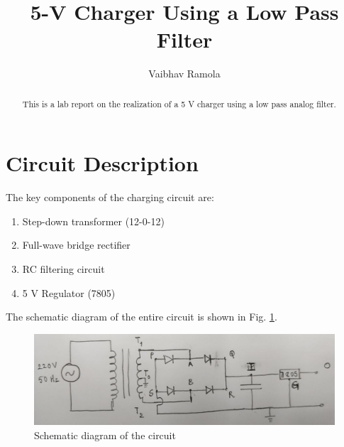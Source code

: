 \documentclass[journal,12pt,twocolumn]{IEEEtran}
\begin{document}
\let\StandardTheFigure\thefigure
\renewcommand{\thefigure}{\arabic{section}.\arabic{figure}}
\makeatletter
{}
\makeatother


\def\putbox#1#2#3{\makebox[0in][l]{\makebox[#1][l]{}\raisebox{\baselineskip}[0in][0in]{\raisebox{#2}[0in][0in]{#3}}}}
\def\rightbox#1{\makebox[0in][r]{#1}}
\def\centbox#1{\makebox[0in]{#1}}
\def\topbox#1{\raisebox{-\baselineskip}[0in][0in]{#1}}
\def\midbox#1{\raisebox{-0.5\baselineskip}[0in][0in]{#1}}

\vspace{3cm}

\title{5-V Charger Using a Low Pass Filter}
\author{Vaibhav Ramola}
\maketitle
\tableofcontents
\renewcommand{\thetable}{\theenumi}
\bigskip
\begin{abstract}
	This is a lab report on the realization of a 5 V charger using
	a low pass analog filter.
\end{abstract}
\section{Circuit Description}
The key components of the charging circuit are:
\begin{enumerate}
	\item Step-down transformer (12-0-12)
	\item Full-wave bridge rectifier
	\item RC filtering circuit
	\item 5 V Regulator (7805)
\end{enumerate}

The schematic diagram of the entire circuit is shown in Fig. \ref{fig:ckt}.
\begin{figure}[!htb]
	\includegraphics[width=\columnwidth]{figs/ckt.jpg}
	\caption{Schematic diagram of the circuit}
	\label{fig:ckt}
\end{figure}
\end{document}
